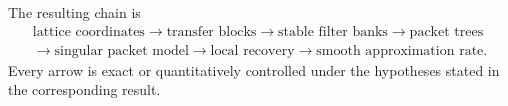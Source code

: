 \documentclass[11pt,a4paper]{article}
\theoremstyle{definition}
\theoremstyle{remark}
\begin{document}
The resulting chain is
\[
\begin{gathered}
\text{lattice coordinates}
\longrightarrow
\text{transfer blocks}
\longrightarrow
\text{stable filter banks}
\longrightarrow
\text{packet trees}
\\
\longrightarrow
\text{singular packet model}
\longrightarrow
\text{local recovery}
\longrightarrow
\text{smooth approximation rate}.
\end{gathered}
\]
Every arrow is exact or quantitatively controlled under the hypotheses stated in the corresponding result.




\end{document}
